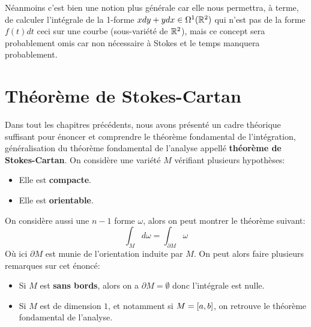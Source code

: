 Néanmoins c'est bien une notion plus générale car elle nous permettra, à terme, de calculer l'intégrale de la 1-forme \( xdy + ydx \in \Omega^1(\mathbb{R}^2) \) qui n'est pas de la forme \( f(t)dt \) ceci sur une courbe (sous-variété de \( \mathbb{R}^2 \)), mais ce concept sera probablement omis car non nécessaire à Stokes et le temps manquera probablement.

\chapter{Théorème de Stokes-Cartan}
Dans tout les chapitres précédents, nous avons présenté un cadre théorique suffisant pour énoncer et comprendre le théorème fondamental de l'intégration, généralisation du théorème fondamental de l'analyse appellé \textbf{théorème de Stokes-Cartan}. On considère une variété \( M \) vérifiant plusieurs hypothèses:
\begin{itemize}
   \item Elle est \textbf{compacte}.
   \item Elle est \textbf{orientable}.
\end{itemize}
On considère aussi une \( n-1 \) forme \( \omega \), alors on peut montrer le théorème suivant:
\[ 
   \int_M d\omega = \int_{\partial M} \omega
\]
Où ici \( \partial M \) est munie de l'orientation induite par \( M \). On peut alors faire plusieurs remarques sur cet énoncé:
\begin{itemize}
   \item Si \( M \) est \textbf{sans bords}, alors on a \( \partial M = \emptyset \) donc l'intégrale est nulle.
   \item Si \( M \) est de dimension \( 1 \), et notamment si \( M = \icc{a}{b} \), on retrouve le théorème fondamental de l'analyse.
\end{itemize}
